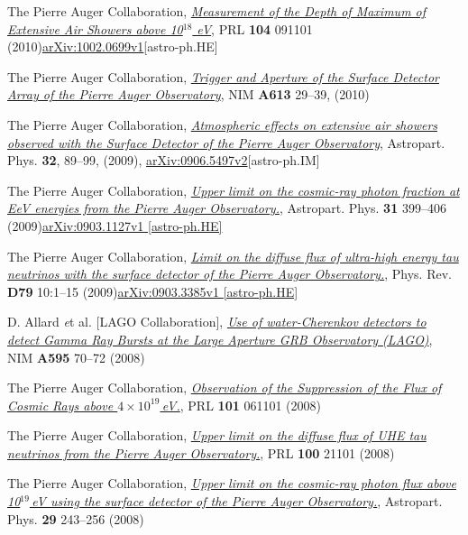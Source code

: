 \documentclass[11pt, a4paper]{article}
\newcommand{\years}[1]{\marginnote{\scriptsize #1}}
\begin{document}
\years{2010}The Pierre Auger Collaboration,
\href{http://dx.doi.org/10.1103/PhysRevLett.104.091101}{\emph{Measurement of
the Depth of Maximum of Extensive Air Showers above 10$^{18}$ eV}}, PRL {\bf
104} 091101
(2010)\href{http://arxiv.org/abs/1002.0699}{arXiv:1002.0699v1}[astro-ph.HE]

\years{2010}The Pierre Auger Collaboration,
\href{http://dx.doi.org/10.1016/j.nima.2009.11.018}{\emph{Trigger and Aperture
of the Surface Detector Array of the Pierre Auger Observatory}}, NIM {\bf A613}
29--39, (2010)

\years{2009} The Pierre Auger Collaboration,
\href{http://dx.doi.org/10.1016/j.astropartphys.2009.06.004}{\emph{Atmospheric
effects on extensive air showers observed with the Surface Detector of the
Pierre Auger Observatory}}, Astropart. Phys. {\bf 32}, 89--99, (2009),
\href{http://arxiv.org/abs/0906.5497/}{arXiv:0906.5497v2}[astro-ph.IM]

\years{2009}The Pierre Auger Collaboration,
\href{http://dx.doi.org/10.1016/j.astropartphys.2009.04.003}{\emph{Upper limit
on the cosmic-ray photon fraction at EeV energies from the Pierre Auger
Observatory.}}, Astropart. Phys. {\bf 31} 399--406
(2009)\href{http://arxiv.org/abs/0903.1127/}{arXiv:0903.1127v1 [astro-ph.HE]}

\years{2009}The Pierre Auger Collaboration,
\href{http://dx.doi.org/10.1103/PhysRevD.79.102001}{\emph{Limit on the diffuse
flux of ultra-high energy tau neutrinos with the surface detector of the Pierre
Auger Observatory.}}, Phys. Rev. {\bf D79} 10:1--15
(2009)\href{http://arxiv.org/abs/0903.3385/}{arXiv:0903.3385v1 [astro-ph.HE]}

\years{2008}D. Allard {\emph et al.} [LAGO Collaboration],
\href{http://dx.doi.org/10.1016/j.nima.2008.07.041}{\emph{Use of
water-Cherenkov detectors to detect Gamma Ray Bursts at the Large Aperture GRB
Observatory (LAGO)}}, NIM {\bf A595} 70--72 (2008)

\years{2008}The Pierre Auger Collaboration,
\href{http://dx.doi.org/10.1103/PhysRevLett.101.061101}{\emph{Observation of
the Suppression of the Flux of Cosmic Rays above $4\times10^{19}$\,eV.}}, PRL
{\bf 101} 061101 (2008)

\years{2008}The Pierre Auger Collaboration,
\href{http://dx.doi.org/10.1103/PhysRevLett.100.211101}{\emph{Upper limit on
the diffuse flux of UHE tau neutrinos from the Pierre Auger Observatory.}}, PRL
{\bf 100} 21101 (2008)

\years{2008}The Pierre Auger Collaboration,
\href{http://dx.doi.org/10.1016/j.astropartphys.2008.01.003}{\emph{Upper limit
on the cosmic-ray photon flux above 10$^{19}$\,eV using the surface detector of
the Pierre Auger Observatory.}}, Astropart. Phys. {\bf 29} 243--256 (2008)
\end{document}

